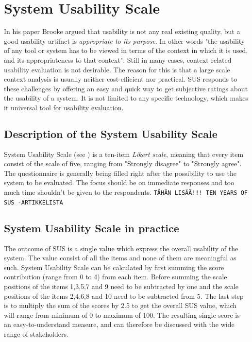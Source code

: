 \documentclass[12pt,a4paper,oneside,pdftex]{report}
\begin{document}
\section{System Usability Scale}
\label{sec:sus}
In his paper Brooke \cite{RefWorks:10} argued that usability is not any real existing quality, but a good usability artifact is \emph{appropriate to its purpose}. In other words "the usability of any tool or system has to be viewed in terms of the context in which it is 			used, and its appropriateness to that context"\cite{RefWorks:10}. Still in many cases, context related usability evaluation is not desirable. The reason for this is that a large scale context analysis is usually neither cost-efficient nor practical.\cite{RefWorks:10} 
SUS responds to these challenges by offering an easy and quick way to get subjective ratings about the usability of a system. It is not limited to any specific technology, which makes it universal tool for usability evaluation. \cite{RefWorks:12}

\subsection{Description of the System Usability Scale}
System Usability Scale (see ) is a ten-item \emph{Likert scale}, meaning that every item consist of the scale of five, ranging from "Strongly disagree" to "Strongly agree". The questionnaire is generally being filled right after the possibility to use 		the system to be evaluated. The focus should be on immediate responses and too much time shouldn't be given to the respondents. \cite{RefWorks:10} 
\texttt{TÄHÄN LISÄÄ!!! TEN YEARS OF SUS -ARTIKKELISTA}


\subsection{System Usability Scale in practice}
The outcome of SUS is a single value which express the overall usability of the system. The value consist of all the items and none of them are meaningful as such. System Usability Scale can be calculated by first summing the score contribution (range from 0 to 4) 			from each item. Before summing the scale positions of the items 1,3,5,7 and 9 need to be subtracted by one and the scale positions of the items 2,4,6,8 and 10 need to be subtracted from 5. The last step is to multiply the sum of the scores by 2.5 to get the overall 			SUS value, which will range from minimum of 0 to maximum of 100. \cite{RefWorks:10} The resulting single score is an easy-to-understand measure, and can therefore be discussed with the wide range of stakeholders. \cite{RefWorks:12} 
\end{document}
